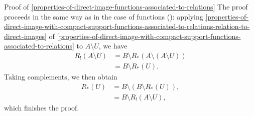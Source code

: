 \begin{Proof}{Proof of \cref{properties-of-direct-image-functions-associated-to-relations}}
    The proof proceeds in the same way as in the case of functions (): applying \cref{properties-of-direct-image-with-compact-support-functions-associated-to-relations-relation-to-direct-images} of \cref{properties-of-direct-image-with-compact-support-functions-associated-to-relations} to $A\setminus U$, we have
    \begin{align*}
        R_{!}(A\setminus U) &= B\setminus R_{*}(A\setminus(A\setminus U))\\
                            &= B\setminus R_{*}(U).
    \end{align*}
    Taking complements, we then obtain
    \begin{align*}
        R_{*}(U) &= B\setminus(B\setminus R_{*}(U)),\\
                 &= B\setminus R_{!}(A\setminus U),
    \end{align*}
    which finishes the proof.
\end{Proof}
